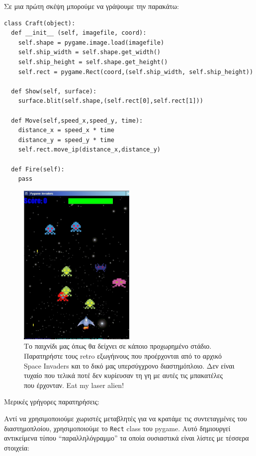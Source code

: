 Σε μια πρώτη σκέψη μπορούμε να γράψουμε την παρακάτω:

\begin{verbatim}
class Craft(object):
  def __init__ (self, imagefile, coord):
    self.shape = pygame.image.load(imagefile)
    self.ship_width = self.shape.get_width()
    self.ship_height = self.shape.get_height()
    self.rect = pygame.Rect(coord,(self.ship_width, self.ship_height))

  def Show(self, surface):
    surface.blit(self.shape,(self.rect[0],self.rect[1]))

  def Move(self,speed_x,speed_y, time):
    distance_x = speed_x * time
    distance_y = speed_y * time
    self.rect.move_ip(distance_x,distance_y)

  def Fire(self):
    pass
\end{verbatim}

\begin{figure}
\centering
\includegraphics[width=0.5\textwidth]{images/chapter7/pygame-invaders}
\caption[Pygame Invaders!]{Το παιχνίδι μας όπως θα δείχνει σε κάποιο προχωρημένο στάδιο. Παρατηρήστε τους retro εξωγήινους που προέρχονται από το αρχικό Space Invaders και το δικό μας υπερσύγχρονο διαστημόπλοιο. Δεν είναι τυχαίο που τελικά ποτέ δεν κυρίευσαν τη γη με αυτές τις μπακατέλες που έρχονταν. Eat my laser alien!}
\label{7-3}
\end{figure}

Μερικές γρήγορες παρατηρήσεις:

Αντί να χρησιμοποιούμε χωριστές μεταβλητές για να κρατάμε τις συντεταγμένες του διαστημοπλοίου, χρησιμοποιούμε το {\tt Rect} class του pygame. Αυτό δημιουργεί αντικείμενα τύπου ``παραλληλόγραμμο'' τα οποία ουσιαστικά είναι λίστες με τέσσερα στοιχεία:

